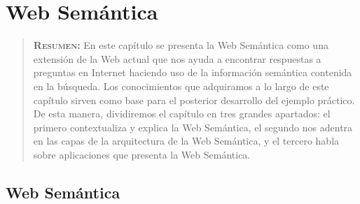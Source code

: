 


\chapter{Web Semántica}
\label{ch:capitulo3}

\begin{quote}
  {\bf\textsc{Resumen:}} En este capítulo se presenta la Web Semántica como una extensión de la Web actual que nos ayuda a encontrar respuestas a preguntas en Internet haciendo uso de la información semántica contenida en la búsqueda. Los conocimientos que adquiramos a lo largo de este capítulo sirven como base para el posterior desarrollo del ejemplo práctico. De esta manera, dividiremos el capítulo en tres grandes apartados: el primero contextualiza y explica la Web Semántica, el segundo nos adentra en las capas de la arquitectura de la Web Semántica, y el tercero habla sobre aplicaciones que presenta la Web Semántica.
\end{quote}

\section{Web Semántica}

